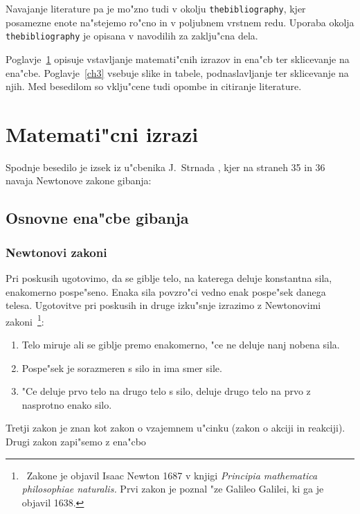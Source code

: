 
Navajanje literature pa je mo"zno tudi v okolju {\tt thebibliography},
kjer posamezne enote na"stejemo ro"cno in v poljubnem vrstnem redu.
Uporaba okolja {\tt thebibliography} je opisana v navodilih za zaklju"cna dela.

Poglavje~\ref{ch2} opisuje vstavljanje matemati"cnih izrazov 
in ena"cb ter sklicevanje na ena"cbe. Poglavje~\ref{ch3} vsebuje 
slike in tabele, podnaslavljanje ter sklicevanje na njih.
Med besedilom so vklju"cene tudi opombe in citiranje literature.

%

\chapter{Matemati"cni izrazi}
\label{ch2}

Spodnje besedilo je izsek iz u"cbenika J.~Strnada \cite{St}, 
kjer na straneh 35 in 36 navaja Newtonove zakone gibanja:

\section{Osnovne ena"cbe gibanja}
\subsection{Newtonovi zakoni}

Pri poskusih ugotovimo, da se giblje telo, na katerega deluje 
konstantna sila, enakomerno pospe"seno. Enaka sila povzro"ci 
vedno enak pospe"sek danega telesa.  Ugotovitve pri poskusih 
in druge izku"snje izrazimo z Newtonovimi zakoni~\footnote{~Zakone 
je objavil Isaac Newton 1687 v knjigi {\it Principia mathematica 
philosophiae naturalis.}  Prvi zakon je poznal "ze Galileo Galilei, 
ki ga je objavil 1638.}:

\begin{enumerate}
\item{Telo miruje ali se giblje premo enakomerno, "ce ne deluje nanj 
nobena sila.}
\item{Pospe"sek je sorazmeren s silo in ima smer sile.}
\item{"Ce deluje prvo telo na drugo telo s silo, deluje drugo telo 
na prvo z nasprotno enako silo.}
\end{enumerate}

Tretji zakon je znan kot zakon o vzajemnem u"cinku (zakon o akciji 
in reakciji). Drugi zakon zapi"semo z ena"cbo


